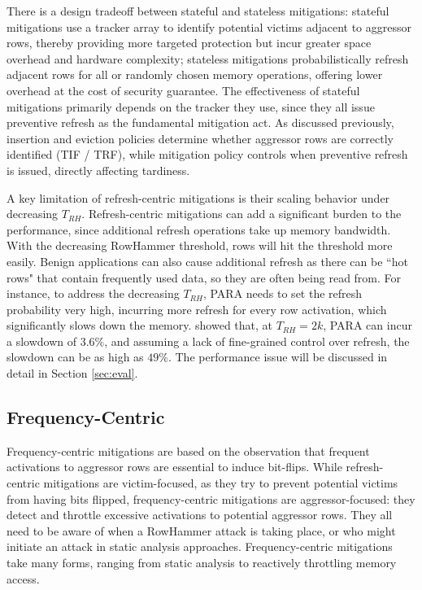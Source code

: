 \documentclass[journal,twocolumn]{IEEEtran}
\begin{document}
There is a design tradeoff between stateful and stateless mitigations: stateful mitigations use a tracker array to identify potential victims adjacent to aggressor rows, thereby providing more targeted protection but incur greater space overhead and hardware complexity; stateless mitigations probabilistically refresh adjacent rows for all or randomly chosen memory operations, offering lower overhead at the cost of security guarantee. The effectiveness of stateful mitigations primarily depends on the tracker they use, since they all issue preventive refresh as the fundamental mitigation act. As discussed previously, insertion and eviction policies determine whether aggressor rows are correctly identified (TIF / TRF), while mitigation policy controls when preventive refresh is issued, directly affecting tardiness.

A key limitation of refresh-centric mitigations is their scaling behavior under decreasing $T_{RH}$. Refresh-centric mitigations can add a significant burden to the performance, since additional refresh operations take up memory bandwidth. With the decreasing RowHammer threshold, rows will hit the threshold more easily. Benign applications can also cause additional refresh as there can be ``hot rows" that contain frequently used data, so they are often being read from. For instance, to address the decreasing $T_{RH}$, PARA needs to set the refresh probability very high, incurring more refresh for every row activation, which significantly slows down the memory. \cite{Taneja25} showed that, at $T_{RH} = 2k$, PARA can incur a slowdown of $3.6\%$, and assuming a lack of fine-grained control over refresh, the slowdown can be as high as $49\%$. The performance issue will be discussed in detail in Section \ref{sec:eval}.

\subsection{Frequency-Centric}

Frequency-centric mitigations are based on the observation that frequent activations to aggressor rows are essential to induce bit-flips. While refresh-centric mitigations are victim-focused, as they try to prevent potential victims from having bits flipped, frequency-centric mitigations are aggressor-focused: they detect and throttle excessive activations to potential aggressor rows. They all need to be aware of when a RowHammer attack is taking place, or who might initiate an attack in static analysis approaches. Frequency-centric mitigations take many forms, ranging from static analysis to reactively throttling memory access.
\end{document}
